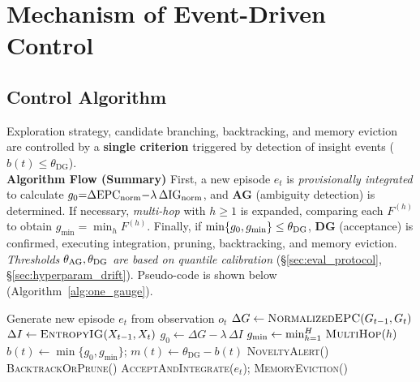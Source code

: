 \documentclass[12pt]{article}
\begin{document}
\section{Mechanism of Event-Driven Control}
\label{sec:event_driven_control}

\subsection{Control Algorithm}
Exploration strategy, candidate branching, backtracking, and memory eviction are controlled by a \textbf{single criterion} triggered by detection of insight events ($b(t)\le\theta_{\mathrm{DG}}$).
\\
\noindent\textbf{Algorithm Flow (Summary)}\; First, a new episode $e_t$ is \emph{provisionally integrated} to calculate $g_0{=}\Delta\mathrm{EPC}_{\rm norm}{-}\lambda\,\Delta\mathrm{IG}_{\rm norm}$, and \textbf{AG} (ambiguity detection) is determined. If necessary, \emph{multi-hop} with $h{\ge}1$ is expanded, comparing each $F^{(h)}$ to obtain $g_{\min}{=}\min_h F^{(h)}$. Finally, if $\min\{g_0,g_{\min}\}\le\theta_{\rm DG}$, \textbf{DG} (acceptance) is confirmed, executing integration, pruning, backtracking, and memory eviction. \emph{Thresholds $\theta_{\rm AG},\theta_{\rm DG}$ are based on quantile calibration} (§\ref{sec:eval_protocol}, §\ref{sec:hyperparam_drift}). Pseudo-code is shown below (Algorithm~\ref{alg:one_gauge}).

\begin{algorithm}[H]
\caption{One-Gauge Event-Driven Control}\label{alg:one_gauge}
\begin{algorithmic}[1]
\State Generate new episode $e_t$ from observation $o_t$
\State $\Delta G \gets \textsc{NormalizedEPC}(G_{t-1}, G_t)$ 
\State $\Delta I \gets \textsc{EntropyIG}(X_{t-1}, X_t)$
\State $g_0 \gets \Delta G - \lambda\,\Delta I$
\State $g_{\min} \gets \min_{h=1}^{H}\, \textsc{MultiHop}(h)$
\State $b(t) \gets \min\{g_0, g_{\min}\}$;\; $m(t) \gets \theta_{\mathrm{DG}}-b(t)$
  \State \textsc{NoveltyAlert}() 
\EndIf
{}
  \State \textsc{BacktrackOrPrune}() 
  \State {}
  \State \textsc{AcceptAndIntegrate}($e_t$);\; \textsc{MemoryEviction}() 
\EndIf
\end{algorithmic}
\end{algorithm}
\end{document}
